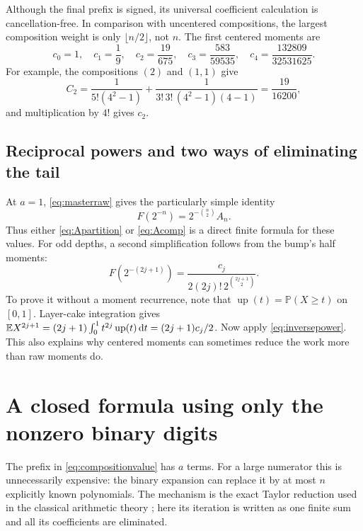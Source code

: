 \documentclass[11pt,oneside]{article}
\theoremstyle{definition}\newtheorem{definition}[theorem]{Definition}
\theoremstyle{remark}\newtheorem{remark}[theorem]{Remark}
\newcommand{\Prob}{\mathbb P}\newcommand{\Up}{\operatorname{up}}
\newcommand{\dd}{\,\mathrm d}\newcommand{\Comp}{\operatorname{Comp}}
\begin{document}
Although the final prefix is signed, its universal coefficient calculation
is cancellation-free. In comparison with uncentered compositions, the largest
composition weight is only $\lfloor n/2\rfloor$, not $n$.
The first centered moments are
\begin{equation}
 c_0=1,\quad c_1=\frac19,\quad c_2=\frac{19}{675},\quad
 c_3=\frac{583}{59535},\quad c_4=\frac{132809}{32531625}.
 \label{eq:firstmoments}
\end{equation}
For example, the compositions $(2)$ and $(1,1)$ give
\[
 C_2=\frac{1}{5!(4^2-1)}
       +\frac{1}{3!\,3!\,(4^2-1)(4-1)}
 =\frac{19}{16200},
\]
and multiplication by $4!$ gives $c_2$.

\subsection{Reciprocal powers and two ways of eliminating the tail}
At $a=1$, \eqref{eq:masterraw} gives the particularly simple identity
\begin{equation}
 \boxed{\displaystyle F(2^{-n})=2^{-\binom n2}A_n.}
 \label{eq:inversepower}
\end{equation}
Thus either \eqref{eq:Apartition} or \eqref{eq:Acomp} is a direct finite
formula for these values. For odd depths, a second simplification follows
from the bump's half moments:
\begin{equation}
 F(2^{-(2j+1)})=
 \frac{c_j}{2(2j)!\,2^{\binom{2j+1}{2}}}.
 \label{eq:odddepth}
\end{equation}
To prove it without a moment recurrence, note that
$\Up(t)=\Prob(X\ge t)$ on $[0,1]$. Layer-cake integration gives
$\E X^{2j+1}=(2j+1)\int_0^1t^{2j}\Up(t)\dd t=(2j+1)c_j/2$.
Now apply \eqref{eq:inversepower}. This also explains why centered moments
can sometimes reduce the work more than raw moments do.

\section{A closed formula using only the nonzero binary digits}
\label{sec:binary}

The prefix in \eqref{eq:compositionvalue} has $a$ terms. For a large numerator
this is unnecessarily expensive: the binary expansion can replace it by at
most $n$ explicitly known polynomials. The mechanism is the exact Taylor
reduction used in the classical arithmetic theory \cite{arias2018}; here its
iteration is written as one finite sum and all its coefficients are eliminated.
\end{document}
